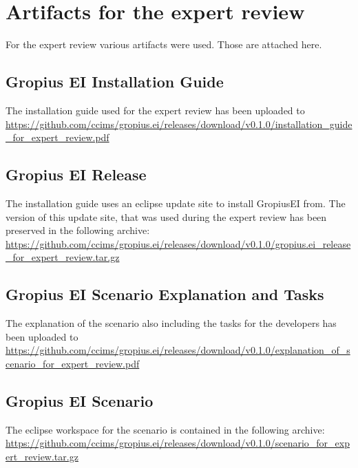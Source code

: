 \chapter{Artifacts for the expert review}
\label{chap:appendix:expert_review_docs}
For the expert review various artifacts were used.
Those are attached here.

\section{Gropius EI Installation Guide}
\label{sec:appendix:er:install_guide}
The installation guide used for the expert review has been uploaded to
\url{https://github.com/ccims/gropius.ei/releases/download/v0.1.0/installation_guide_for_expert_review.pdf}

\section{Gropius EI Release}
\label{sec:appendix:er:release}
The installation guide uses an eclipse update site to install \gls{GropiusEI} from.
The version of this update site, that was used during the expert review has been preserved in the following archive:
\url{https://github.com/ccims/gropius.ei/releases/download/v0.1.0/gropius.ei_release_for_expert_review.tar.gz}

\section{Gropius EI Scenario Explanation and Tasks}
\label{sec:appendix:er:scenario_explanation}
The explanation of the scenario also including the tasks for the developers has been uploaded to
\url{https://github.com/ccims/gropius.ei/releases/download/v0.1.0/explanation_of_scenario_for_expert_review.pdf}

\section{Gropius EI Scenario}
\label{sec:appendix:er:scenario}
The eclipse workspace for the scenario is contained in the following archive:
\url{https://github.com/ccims/gropius.ei/releases/download/v0.1.0/scenario_for_expert_review.tar.gz}